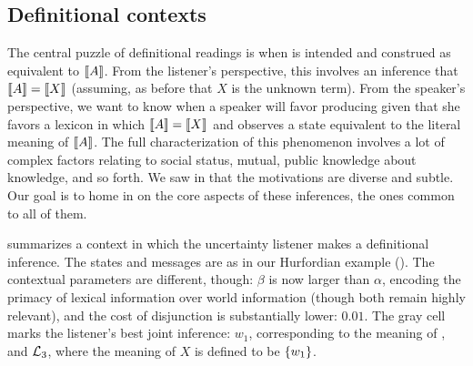 \documentclass{article}
\begin{document}
\subsection{Definitional contexts}\label{sec:analysis:definitional}

The central puzzle of definitional readings is when  is
intended and construed as equivalent to $\llbracket A\rrbracket$. From the listener's
perspective, this involves an inference that $\llbracket A\rrbracket=\llbracket X\rrbracket$
(assuming, as before that $X$ is the unknown term). From the speaker's
perspective, we want to know when a speaker will favor producing
 given that she favors a lexicon in which
$\llbracket A\rrbracket=\llbracket X\rrbracket$ and observes a state equivalent to the literal
meaning of $\llbracket A\rrbracket$. The full characterization of this phenomenon
involves a lot of complex factors relating to social status, mutual,
public knowledge about knowledge, and so forth. We saw in
 that the motivations are diverse and subtle. Our
goal is to home in on the core aspects of these inferences, the ones
common to all of them.

 summarizes a context in which the uncertainty
listener makes a definitional inference. The states and messages are
as in our Hurfordian example (). The contextual
parameters are different, though: $\beta$ is now larger than $\alpha$,
encoding the primacy of lexical information over world information
(though both remain highly relevant), and the cost of disjunction is
substantially lower: $0.01$. The gray cell marks the listener's best
joint inference: $w_{1}$, corresponding to the meaning of ,
and $\mathcal{L}_{3}$, where the meaning of $X$ is defined to be
$\left\{ w_{1} \right\}$.
\end{document}
